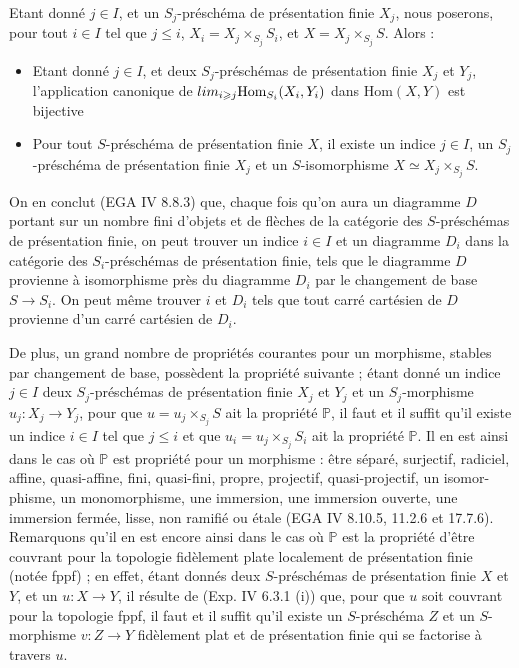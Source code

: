 \documentclass[11pt,a4paper]{article}
\begin{document}
Etant donné $j \in I$, et un $S_{j}$-préschéma de présentation finie
$X_{j}$, nous poserons, pour tout $i \in I$ tel que $j \leqslant i$,
$X_{i} = X_{j} \times_{S_{j}} S_{i}$, et $X = X_{j} \times_{S_{j}} S$.
Alors  :
\begin{itemize}
  \item[i)] Etant donné $j \in I$, et deux $S_{j}$-préschémas de
    présentation finie $X_{j}$ et $Y_{j}$, l'application canonique de
    $\varinjlim_{i \geqslant j} \mathrm{Hom}_{S_{i}}(X_{i}, Y_{i})$ dans
    $\mathrm{Hom}(X, Y)$ est bijective
  \item[ii)] Pour tout $S$-préschéma de présentation finie $X$, il existe
    un indice $j \in I$,  un $S_{j}$-préschéma de présentation
    finie $X_{j}$ et un $S$-isomorphisme
    $X \simeq X_{j} \times_{S_{j}} S$.
\end{itemize}

On en conclut (EGA IV 8.8.3) que, chaque fois qu'on aura un diagramme $D$
portant sur un nombre fini d'objets et de flèches de la catégorie des
$S$-préschémas de présentation finie, on peut trouver un indice $i \in I$
et un diagramme $D_{i}$ dans la catégorie des $S_{i}$-préschémas de
présentation finie, tels que le diagramme $D$ provienne à isomorphisme
près du diagramme $D_{i}$ par le changement de base $S \to S_{i}$. On peut
même trouver $i$ et $D_{i}$ tels que tout carré cartésien de $D$ provienne
d'un carré cartésien de $D_{i}$.

 De plus, un grand nombre de propriétés \struck{\ill{}}
courantes pour un morphisme, stables par changement de base, possèdent la
propriété suivante ; étant donné un indice $j \in I$ deux
$S_{j}$-préschémas de présentation finie $X_{j}$ et $Y_{j}$ et un
$S_{j}$-morphisme $u_{j} \colon X_{j} \to Y_{j}$, pour que
$u = u_{j} \times_{S_{j}} S$ ait la propriété $\mathbb{P}$, il faut et il
suffit qu'il existe un indice $i \in I$ tel que $j \leqslant i$ et que
$u_{i} = u_{j} \times_{S_{j}} S_{i}$ ait la propriété $\mathbb{P}$. Il en
est ainsi dans le cas où $\mathbb{P}$ est  
propriété  pour un morphisme : être séparé,
surjectif, radiciel, affine, quasi-affine, fini, quasi-fini, propre,
projectif, quasi-projectif, un isomor-
phisme, un monomorphisme, une immersion, une immersion ouverte, une
immersion fermée, lisse, non ramifié ou étale (EGA IV 8.10.5, 11.2.6 et
17.7.6). Remarquons qu'il en est encore ainsi \struck{\ill{}} dans le cas
où $\mathbb{P}$ est la propriété d'être couvrant pour la topologie
fidèlement plate localement de présentation finie (notée fppf) ; en effet,
étant donnés deux $S$-préschémas de présentation finie $X$ et $Y$, et un
  $u \colon X \to Y$, il résulte de
(Exp. IV 6.3.1 (i)) que, pour que $u$ soit couvrant pour la topologie
fppf, il faut et il suffit qu'il existe un $S$-préschéma $Z$ et un
$S$-morphisme $v \colon Z \to Y$ fidèlement plat et de présentation finie
qui se factorise à travers $u$.
\end{document}
